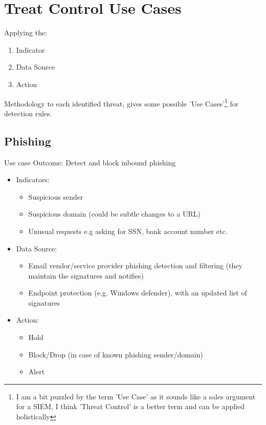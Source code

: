 \documentclass[
	letterpaper, %
	10pt, %
	unnumberedsections, %
	twoside, %
]{APAAssignment}
\begin{document}
\section{Treat Control Use Cases}

Applying the:
\begin{spacing}{1}
	\begin{enumerate}
		\item Indicator
		\item Data Source
		\item Action
	\end{enumerate}
\end{spacing}
Methodology to each identified threat, gives some possible 'Use Cases'\footnote{I am a bit puzzled by the term 'Use Case' as it sounds like a sales argument for a SIEM, I think 'Threat Control' is a better term and can be applied holistically} for detection rules.

\subsection{Phishing}
Use case Outcome: Detect and block inbound phishing
\begin{spacing}{1}
	\begin{itemize}
		\item Indicators:
		      \begin{itemize}
			      \item Suspicious sender
			      \item Suspicious domain (could be subtle changes to a URL)
			      \item Unusual requests e.g asking for SSN, bank account number etc.
		      \end{itemize}
		\item Data Source:
		      \begin{itemize}
			      \item Email vendor/service provider phishing detection and filtering (they maintain the signatures and notifies)
			      \item Endpoint protection (e.g. Windows defender\cite{WindowsDefenderCommercial}), with an updated list of signatures
		      \end{itemize}
		\item Action:
		      \begin{itemize}
			      \item Hold
			      \item Block/Drop (in case of known phishing sender/domain)
			      \item Alert
		      \end{itemize}
	\end{itemize}
\end{spacing}
\end{document}
